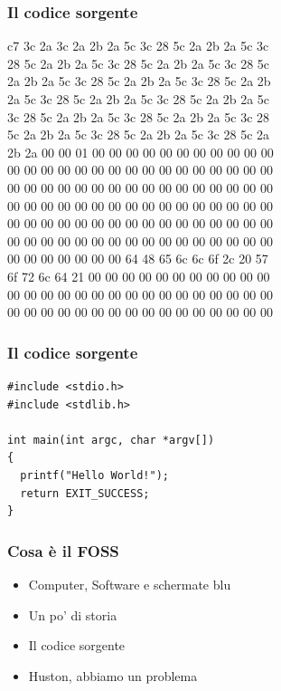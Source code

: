 \documentclass{beamer}
\begin{document}
\begin{frame}
  \frametitle{Il codice sorgente}
  \fontsize{12}{7.2}\selectfont
  \begin{center}
c7 3c 2a 3c 2a 2b 2a 5c 3c 28 5c 2a 2b 2a 5c 3c\\
28 5c 2a 2b 2a 5c 3c 28 5c 2a 2b 2a 5c 3c 28 5c\\
2a 2b 2a 5c 3c 28 5c 2a 2b 2a 5c 3c 28 5c 2a 2b\\
2a 5c 3c 28 5c 2a 2b 2a 5c 3c 28 5c 2a 2b 2a 5c\\
3c 28 5c 2a 2b 2a 5c 3c 28 5c 2a 2b 2a 5c 3c 28\\
5c 2a 2b 2a 5c 3c 28 5c 2a 2b 2a 5c 3c 28 5c 2a\\
2b 2a 00 00 01 00 00 00 00 00 00 00 00 00 00 00\\
00 00 00 00 00 00 00 00 00 00 00 00 00 00 00 00\\
00 00 00 00 00 00 00 00 00 00 00 00 00 00 00 00\\
00 00 00 00 00 00 00 00 00 00 00 00 00 00 00 00\\
00 00 00 00 00 00 00 00 00 00 00 00 00 00 00 00\\
00 00 00 00 00 00 00 00 00 00 00 00 00 00 00 00\\
00 00 00 00 00 00 00 64 48 65 6c 6c 6f 2c 20 57\\
6f 72 6c 64 21 00 00 00 00 00 00 00 00 00 00 00\\
00 00 00 00 00 00 00 00 00 00 00 00 00 00 00 00\\
00 00 00 00 00 00 00 00 00 00 00 00 00 00 00 00
  \end{center}

\end{frame}


\begin{frame}[fragile]
  \frametitle{Il codice sorgente}
  
  \begin{verbatim}
#include <stdio.h>
#include <stdlib.h>

int main(int argc, char *argv[])
{
  printf("Hello World!");
  return EXIT_SUCCESS;
}
  \end{verbatim}

\end{frame}

\begin{frame}
  \frametitle{Cosa \`e il FOSS}

  \begin{itemize}
    \item Computer, Software e schermate blu
    \item Un po' di storia
    \item Il codice sorgente
    \item Huston, abbiamo un problema
  \end{itemize}

\end{frame}
\end{document}
